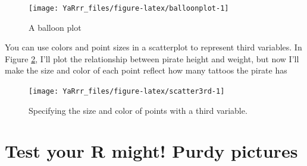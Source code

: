 \documentclass[]{book}
\newenvironment{Shaded}{\begin{snugshade}}{\end{snugshade}}
\newcommand{\KeywordTok}[1]{\textcolor[rgb]{0.13,0.29,0.53}{\textbf{{#1}}}}
\newcommand{\DataTypeTok}[1]{\textcolor[rgb]{0.13,0.29,0.53}{{#1}}}
\newcommand{\DecValTok}[1]{\textcolor[rgb]{0.00,0.00,0.81}{{#1}}}
\newcommand{\StringTok}[1]{\textcolor[rgb]{0.31,0.60,0.02}{{#1}}}
\newcommand{\CommentTok}[1]{\textcolor[rgb]{0.56,0.35,0.01}{\textit{{#1}}}}
\newcommand{\NormalTok}[1]{{#1}}
\theoremstyle{definition}
\theoremstyle{definition}
\theoremstyle{remark}
\begin{document}
\begin{figure}

{\centering \texttt{[image: YaRrr\_files/figure-latex/balloonplot-1]} 

}

\caption{A balloon plot}\label{fig:balloonplot}
\end{figure}

You can use colors and point sizes in a scatterplot to represent third
variables. In Figure \ref{fig:scatter3rd}, I'll plot the relationship
between pirate height and weight, but now I'll make the size and color
of each point reflect how many tattoos the pirate has

\begin{Shaded}
\end{Shaded}

\begin{figure}

{\centering \texttt{[image: YaRrr\_files/figure-latex/scatter3rd-1]} 

}

\caption{Specifying the size and color of points with a third variable.}\label{fig:scatter3rd}
\end{figure}

\section{Test your R might! Purdy
pictures}\label{test-your-r-might-purdy-pictures}
\end{document}
